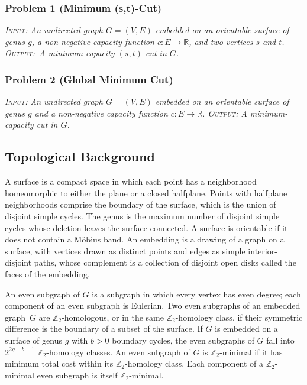 \documentclass[natbib]{svcyclop}
\begin{document}
\subsubsection{Problem 1 (Minimum (s,t)-Cut)}
{\itshape
\textsc{Input}: An undirected graph $G = (V, E)$ embedded on an orientable surface of genus $g$, a non-negative capacity function $c\colon E \to \mathbb{R}$, and two vertices $s$ and $t$. \textsc{Output}:~A minimum-capacity $(s,t)$-cut in $G$.}

\subsubsection{Problem 2 (Global Minimum Cut)}
{\itshape
\textsc{Input}: An undirected graph $G = (V, E)$ embedded on an orientable surface of genus $g$ and a non-negative capacity function $c\colon E \to \mathbb{R}$.  \textsc{Output}: A minimum-capacity cut in $G$.}




\KeyRes

\subsection{Topological Background}

A surface is a compact space in which each point has a neighborhood homeomorphic to either the plane or a closed halfplane.
Points with halfplane neighborhoods comprise the boundary of the surface, which is the union of disjoint simple cycles.
The genus is the maximum number of disjoint simple cycles whose deletion leaves the surface connected.
A surface is orientable if it does not contain a Möbius band.
An embedding is a drawing of a graph on a surface, with vertices drawn as distinct points and edges as simple interior-disjoint paths, whose complement is a collection of disjoint open disks called the faces of the embedding.

An even subgraph of $G$ is a subgraph in which every vertex has even degree; each component of an even subgraph is Eulerian.
Two even subgraphs of an embedded graph~$G$ are $\mathbb{Z}_2$-homologous, or in the same $\mathbb{Z}_2$-homology class, if their symmetric difference is the boundary of a subset of the surface.  If $G$ is embedded on a surface of genus $g$ with $b>0$ boundary cycles, the even subgraphs of $G$ fall into $2^{2g+b-1}$ $\mathbb{Z}_2$-homology classes.
An even subgraph of $G$ is $\mathbb{Z}_2$-minimal if it has minimum total cost within its $\mathbb{Z}_2$-homology class.
Each component of a $\mathbb{Z}_2$-minimal even subgraph is itself $\mathbb{Z}_2$-minimal.
\end{document}
